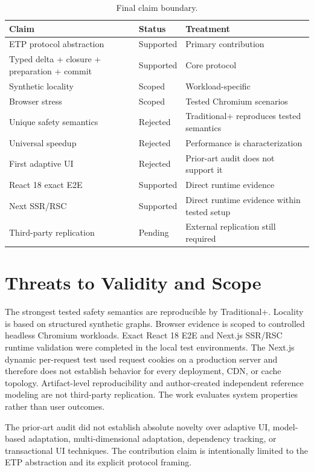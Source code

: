 \documentclass[manuscript,anonymous]{acmart}
\begin{document}
\begin{table}[t]
\centering
\caption{Final claim boundary.}
\label{tab:claim-boundary}
\small
\begin{tabular}{p{}p{}p{}}
\toprule
Claim & Status & Treatment\\
\midrule
ETP protocol abstraction & Supported & Primary contribution\\
Typed delta + closure + preparation + commit & Supported & Core protocol\\
Synthetic locality & Scoped & Workload-specific\\
Browser stress & Scoped & Tested Chromium scenarios\\
Unique safety semantics & Rejected & Traditional+ reproduces tested semantics\\
Universal speedup & Rejected & Performance is characterization\\
First adaptive UI & Rejected & Prior-art audit does not support it\\
React 18 exact E2E & Supported & Direct runtime evidence\\
Next SSR/RSC & Supported & Direct runtime evidence within tested setup\\
Third-party replication & Pending & External replication still required\\
\bottomrule
\end{tabular}
\end{table}

\section{Threats to Validity and Scope}
The strongest tested safety semantics are reproducible by Traditional+. Locality is based on
structured synthetic graphs. Browser evidence is scoped to controlled headless Chromium
workloads. Exact React 18 E2E and Next.js SSR/RSC runtime validation were completed in the local test environments. The Next.js dynamic per-request test used request cookies on a production server and therefore does not establish behavior for every deployment, CDN, or cache topology.
Artifact-level reproducibility and author-created independent reference modeling are not
third-party replication. The work evaluates system properties rather than user outcomes.

The prior-art audit did not establish absolute novelty over adaptive UI, model-based
adaptation, multi-dimensional adaptation, dependency tracking, or transactional UI
techniques. The contribution claim is intentionally limited to the ETP abstraction and its
explicit protocol framing.
\end{document}
